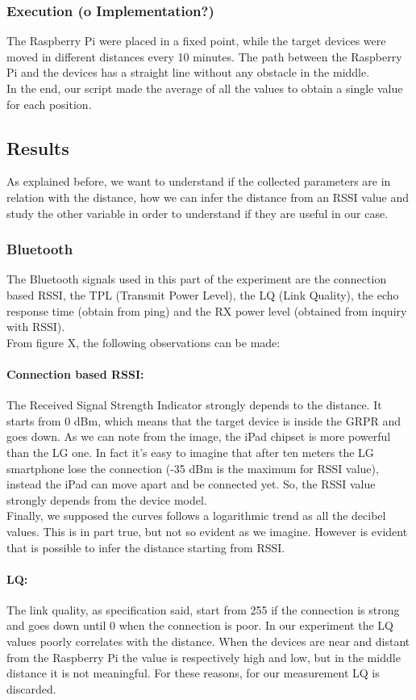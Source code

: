 \subsubsection{Execution (o Implementation?)}
The Raspberry Pi were placed in a fixed point, while the target devices were moved in different distances every 10 minutes. The path between the Raspberry Pi and the devices has a straight line without any obstacle in the middle.\\
In the end, our script made the average of all the values to obtain a single value for each position.
\subsection{Results}
As explained before, we want to understand if the collected parameters are in relation with the distance, how we can infer the distance from an RSSI value and study the other variable in order to understand if they are useful in our case.\\
\subsubsection{Bluetooth}
The Bluetooth signals used in this part of the experiment are the connection based RSSI, the TPL (Transmit Power Level), the LQ (Link Quality), the echo response time (obtain from ping) and the RX power level (obtained from inquiry with RSSI).\\
From figure X, the following observations can be made:
\paragraph{Connection based RSSI:} The Received Signal Strength Indicator strongly depends to the distance. It starts from 0 dBm, which means that the target device is inside the GRPR and goes down. As we can note from the image, the iPad chipset is more powerful than the LG one. In fact it's easy to imagine that after ten meters the LG smartphone lose the connection (-35 dBm is the maximum for RSSI value), instead the iPad can move apart and be connected yet. So, the RSSI value strongly depends from the device model.\\
Finally, we supposed the curves follows a logarithmic trend as all the decibel values. This is in part true, but not so evident as we imagine. However is evident that is possible to infer the distance starting from RSSI.
\paragraph{LQ:} The link quality, as specification said, start from 255 if the connection is strong and goes down until 0 when the connection is poor. In our experiment the LQ values poorly correlates with the distance. When the devices are near and distant from the Raspberry Pi the value is respectively high and low, but in the middle distance it is not meaningful. For these reasons, for our measurement LQ is discarded.
